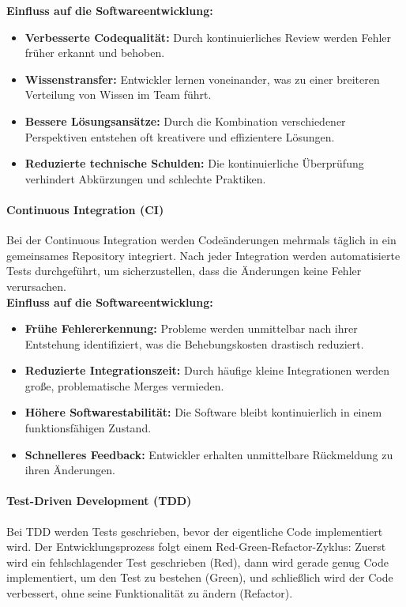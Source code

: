 \textbf{Einfluss auf die Softwareentwicklung:}
\begin{itemize}
    \item \textbf{Verbesserte Codequalität:} Durch kontinuierliches Review werden Fehler früher erkannt und behoben.
    \item \textbf{Wissenstransfer:} Entwickler lernen voneinander, was zu einer breiteren Verteilung von Wissen im Team führt.
    \item \textbf{Bessere Lösungsansätze:} Durch die Kombination verschiedener Perspektiven entstehen oft kreativere und effizientere Lösungen.
    \item \textbf{Reduzierte technische Schulden:} Die kontinuierliche Überprüfung verhindert Abkürzungen und schlechte Praktiken.
\end{itemize}

\paragraph{Continuous Integration (CI)}
Bei der Continuous Integration werden Codeänderungen mehrmals täglich in ein gemeinsames Repository integriert. Nach jeder Integration 
werden automatisierte Tests durchgeführt, um sicherzustellen, dass die Änderungen keine Fehler verursachen.
\\

\textbf{Einfluss auf die Softwareentwicklung:}
\begin{itemize}
    \item \textbf{Frühe Fehlererkennung:} Probleme werden unmittelbar nach ihrer Entstehung identifiziert, was die Behebungskosten drastisch reduziert.
    \item \textbf{Reduzierte Integrationszeit:} Durch häufige kleine Integrationen werden große, problematische Merges vermieden.
    \item \textbf{Höhere Softwarestabilität:} Die Software bleibt kontinuierlich in einem funktionsfähigen Zustand.
    \item \textbf{Schnelleres Feedback:} Entwickler erhalten unmittelbare Rückmeldung zu ihren Änderungen.
\end{itemize}

\paragraph{Test-Driven Development (TDD)}
Bei TDD werden Tests geschrieben, bevor der eigentliche Code implementiert wird. Der Entwicklungsprozess folgt 
einem Red-Green-Refactor-Zyklus: Zuerst wird ein fehlschlagender Test geschrieben (Red), dann wird gerade genug Code implementiert,
um den Test zu bestehen (Green), und schließlich wird der Code verbessert, ohne seine Funktionalität zu ändern (Refactor).
\\

